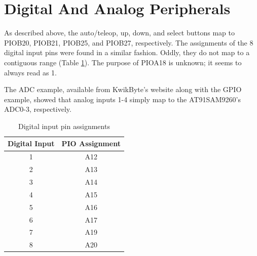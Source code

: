 \documentclass[]{article}
\begin{document}
\section{Digital And Analog Peripherals}
\par As described above, the auto/teleop, up, down, and select buttons map to PIOB20, PIOB21, PIOB25, and PIOB27, respectively. The assignments of the 8 digital input pins were found in a similar fashion. Oddly, they do not map to a contiguous range (Table \ref{tab:DI_pins}). The purpose of PIOA18 is unknown; it seems to always read as 1.
\par The ADC example, available from KwikByte's website along with the GPIO example, showed that analog inputs 1-4 simply map to the AT91SAM9260's ADC0-3, respectively. 
\begin{table}
	\centering
	\begin{tabular}{|c|c|}
		\hline
		Digital Input & PIO Assignment \\ \hline
		1 & A12 \\ \hline
		2 & A13 \\ \hline
		3 & A14 \\ \hline
		4 & A15 \\ \hline
		5 & A16 \\ \hline
		6 & A17 \\ \hline
		7 & A19 \\ \hline
		8 & A20 \\ \hline
	\end{tabular}
	\caption{Digital input pin assignments}
	\label{tab:DI_pins}
\end{table}
\end{document}
